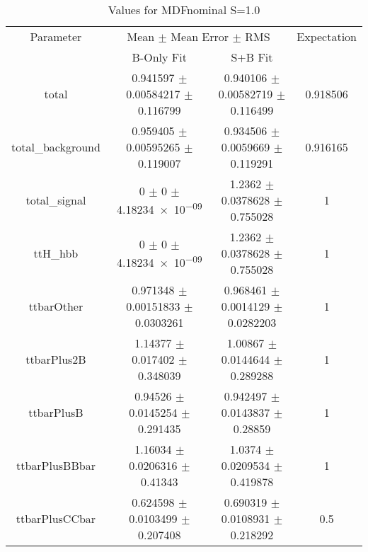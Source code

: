 \begin{table}
\centering
\caption{Values for MDFnominal S=1.0}
\begin{tabular}{cccc}
\toprule
Parameter & \multicolumn{2}{c}{Mean $\pm$ Mean Error $\pm$ RMS} & Expectation\\
 & B-Only Fit & S+B Fit & \\
\midrule
total & \num{0.941597} $\pm$ \num{0.00584217} $\pm$ \num{0.116799} & \num{0.940106} $\pm$ \num{0.00582719} $\pm$ \num{0.116499} & \num{0.918506}\\
total\_background & \num{0.959405} $\pm$ \num{0.00595265} $\pm$ \num{0.119007} & \num{0.934506} $\pm$ \num{0.0059669} $\pm$ \num{0.119291} & \num{0.916165}\\
total\_signal & \num{0} $\pm$ \num{0} $\pm$ \num{4.18234e-09} & \num{1.2362} $\pm$ \num{0.0378628} $\pm$ \num{0.755028} & \num{1}\\
ttH\_hbb & \num{0} $\pm$ \num{0} $\pm$ \num{4.18234e-09} & \num{1.2362} $\pm$ \num{0.0378628} $\pm$ \num{0.755028} & \num{1}\\
ttbarOther & \num{0.971348} $\pm$ \num{0.00151833} $\pm$ \num{0.0303261} & \num{0.968461} $\pm$ \num{0.0014129} $\pm$ \num{0.0282203} & \num{1}\\
ttbarPlus2B & \num{1.14377} $\pm$ \num{0.017402} $\pm$ \num{0.348039} & \num{1.00867} $\pm$ \num{0.0144644} $\pm$ \num{0.289288} & \num{1}\\
ttbarPlusB & \num{0.94526} $\pm$ \num{0.0145254} $\pm$ \num{0.291435} & \num{0.942497} $\pm$ \num{0.0143837} $\pm$ \num{0.28859} & \num{1}\\
ttbarPlusBBbar & \num{1.16034} $\pm$ \num{0.0206316} $\pm$ \num{0.41343} & \num{1.0374} $\pm$ \num{0.0209534} $\pm$ \num{0.419878} & \num{1}\\
ttbarPlusCCbar & \num{0.624598} $\pm$ \num{0.0103499} $\pm$ \num{0.207408} & \num{0.690319} $\pm$ \num{0.0108931} $\pm$ \num{0.218292} & \num{0.5}\\
\bottomrule
\end{tabular}
\end{table}